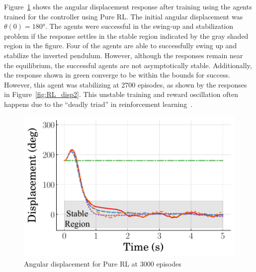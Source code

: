 Figure~\ref{fig:RL_disp} shows the angular displacement response after training using the agents trained for the controller using Pure RL. The initial angular displacement was $\theta(0)=180\si{\degree}$. The agents were successful in the swing-up and stabilization problem if the response settles in the stable region indicated by the gray shaded region in the figure. Four of the agents are able to successfully swing up and stabilize the inverted pendulum.
%
However, although the responses remain near the equilibrium, the successful agents are not asymptotically stable. Additionally, the response shown in green converge to be within the bounds for success.
%
However, this agent was stabilizing at 2700 episodes, as shown by the responses in Figure~\ref{fig:RL_disp2}.
%
This unstable training and reward oscillation often happens due to the ``deadly triad'' in reinforcement learning~\cite{Sutton:2018a,Dong:2021a}.

\begin{figure}[t]
    \centering
    \includegraphics[scale=0.65]{figures/figures_RL_model_based_control/Angular_displacement_pure_RL}
    \caption{Angular displacement for Pure RL at 3000 episodes}
    \label{fig:RL_disp}
\end{figure}

